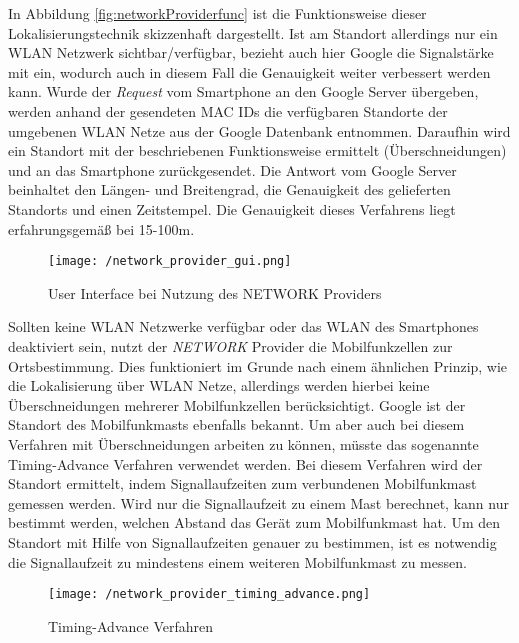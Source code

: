 In Abbildung \ref{fig:networkProviderfunc} ist die Funktionsweise dieser Lokalisierungstechnik skizzenhaft dargestellt. Ist am Standort allerdings nur ein WLAN Netzwerk sichtbar/verfügbar, bezieht auch hier Google die Signalstärke mit ein, wodurch auch in diesem Fall die Genauigkeit weiter verbessert werden kann.
Wurde der \textit{Request} vom Smartphone an den Google Server übergeben, werden anhand der gesendeten MAC IDs die verfügbaren Standorte der umgebenen WLAN Netze aus der Google Datenbank entnommen. Daraufhin wird ein Standort mit der beschriebenen Funktionsweise ermittelt (Überschneidungen) und an das Smartphone zurückgesendet. Die Antwort vom Google Server beinhaltet den Längen- und Breitengrad, die Genauigkeit des gelieferten Standorts und einen Zeitstempel. Die Genauigkeit dieses Verfahrens liegt erfahrungsgemäß bei 15-100m.

\begin{figure}[H]
\centering
\texttt{[image: /network\_provider\_gui.png]}
\caption[Lokalisierung: User Interface bei Nutzung des NETWORK Providers]{User Interface bei Nutzung des NETWORK Providers}
\label{fig:networkProviderGui}
\end{figure}

Sollten keine WLAN Netzwerke verfügbar oder das WLAN des Smartphones deaktiviert sein, nutzt der \textit{NETWORK} Provider die Mobilfunkzellen zur Ortsbestimmung. Dies funktioniert im Grunde nach einem ähnlichen Prinzip, wie die Lokalisierung über WLAN Netze, allerdings werden hierbei keine Überschneidungen mehrerer Mobilfunkzellen berücksichtigt. Google ist der Standort des Mobilfunkmasts ebenfalls bekannt. Um aber auch bei diesem Verfahren mit Überschneidungen arbeiten zu können, müsste das sogenannte Timing-Advance Verfahren verwendet werden. Bei diesem Verfahren wird der Standort ermittelt, indem Signallaufzeiten zum verbundenen Mobilfunkmast gemessen werden. Wird nur die Signallaufzeit zu einem Mast berechnet, kann nur bestimmt werden, welchen Abstand das Gerät zum Mobilfunkmast hat. Um den Standort mit Hilfe von Signallaufzeiten genauer zu bestimmen, ist es notwendig die Signallaufzeit zu mindestens einem weiteren Mobilfunkmast zu messen.

\begin{figure}[H]
\centering
\texttt{[image: /network\_provider\_timing\_advance.png]}
\caption[Lokalisierung: Timing-Advance Verfahren]{Timing-Advance Verfahren}
\label{fig:networkProviderTimingAdvance}
\end{figure}


